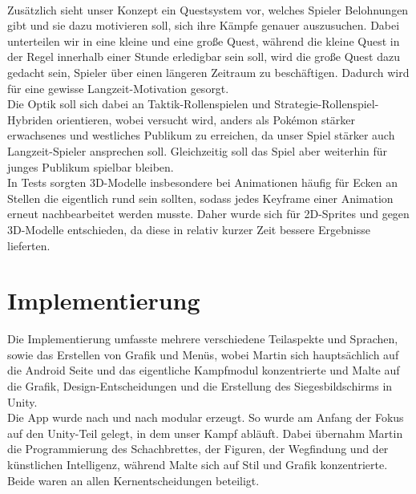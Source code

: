 \documentclass[extern,palatino]{cgBA}
\begin{document}
\\Zusätzlich sieht unser Konzept ein Questsystem vor, welches Spieler Belohnungen gibt und sie dazu motivieren soll, sich ihre Kämpfe genauer auszusuchen. Dabei unterteilen wir in eine kleine und eine große Quest, während die kleine Quest in der Regel innerhalb einer Stunde erledigbar sein soll, wird die große Quest dazu gedacht sein, Spieler über einen längeren Zeitraum zu beschäftigen. Dadurch wird für eine gewisse Langzeit-Motivation gesorgt.
\\Die Optik soll sich dabei an Taktik-Rollenspielen und Strategie-Rollenspiel-Hybriden orientieren, wobei versucht wird, anders als Pokémon stärker erwachsenes und westliches Publikum zu erreichen, da unser Spiel stärker%
 auch Langzeit-Spieler ansprechen soll. Gleichzeitig soll das Spiel aber weiterhin für junges Publikum spielbar bleiben.  \\In Tests sorgten 3D-Modelle insbesondere bei Animationen häufig für Ecken an Stellen die eigentlich rund sein sollten, sodass jedes Keyframe einer Animation erneut nachbearbeitet werden musste. Daher wurde sich für 2D-Sprites und gegen 3D-Modelle entschieden, da diese in relativ kurzer Zeit bessere Ergebnisse lieferten.
\newpage
\section{Implementierung}
Die Implementierung umfasste mehrere verschiedene Teilaspekte und Sprachen, sowie das Erstellen von Grafik und Menüs, wobei Martin sich hauptsächlich auf die Android Seite und das eigentliche Kampfmodul konzentrierte und Malte auf die Grafik, Design-Entscheidungen und die Erstellung des Siegesbildschirms in Unity.
\\Die App wurde nach und nach modular erzeugt. So wurde am Anfang der Fokus auf den Unity-Teil gelegt, in dem unser Kampf abläuft. Dabei übernahm Martin die Programmierung des Schachbrettes, der Figuren, der Wegfindung und der künstlichen Intelligenz, während Malte sich auf Stil und Grafik konzentrierte. Beide waren an allen Kernentscheidungen beteiligt.
\end{document}
